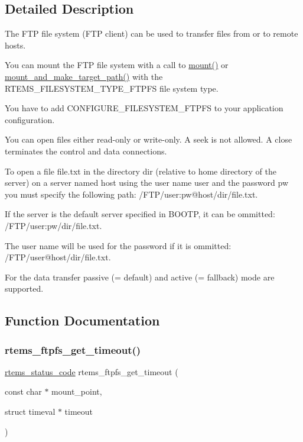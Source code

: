 \subsection{Detailed Description}
The F\+TP file system (F\+TP client) can be used to transfer files from or to remote hosts. 

You can mount the F\+TP file system with a call to \mbox{\hyperlink{group__FileSystemTypesAndMount_gaf3c1bed49bb0f3dec88d330b4f88d48b}{mount()}} or \mbox{\hyperlink{group__FileSystemTypesAndMount_ga27af6440b4ef795576c94e870c5d997f}{mount\+\_\+and\+\_\+make\+\_\+target\+\_\+path()}} with the R\+T\+E\+M\+S\+\_\+\+F\+I\+L\+E\+S\+Y\+S\+T\+E\+M\+\_\+\+T\+Y\+P\+E\+\_\+\+F\+T\+P\+FS file system type.

You have to add C\+O\+N\+F\+I\+G\+U\+R\+E\+\_\+\+F\+I\+L\+E\+S\+Y\+S\+T\+E\+M\+\_\+\+F\+T\+P\+FS to your application configuration.

You can open files either read-\/only or write-\/only. A seek is not allowed. A close terminates the control and data connections.

To open a file {\ttfamily file.\+txt} in the directory {\ttfamily dir} (relative to home directory of the server) on a server named {\ttfamily host} using the user name {\ttfamily user} and the password {\ttfamily pw} you must specify the following path\+: {\ttfamily /\+F\+T\+P/user\+:pw@host/dir/file.\+txt}.

If the server is the default server specified in B\+O\+O\+TP, it can be ommitted\+: {\ttfamily /\+F\+T\+P/user\+:pw/dir/file.\+txt}.

The user name will be used for the password if it is ommitted\+: {\ttfamily /\+F\+T\+P/user@host/dir/file.\+txt}.

For the data transfer passive (= default) and active (= fallback) mode are supported. 

\subsection{Function Documentation}
\mbox{\label{group__rtems__ftpfs_ga6dde83f58606a122aec703001c59c571}} 
\subsubsection{\texorpdfstring{rtems\_ftpfs\_get\_timeout()}{rtems\_ftpfs\_get\_timeout()}}
{\footnotesize\ttfamily \mbox{\hyperlink{group__ClassicStatus_ga545d41846817eaba6143d52ee4d9e9fe}{rtems\+\_\+status\+\_\+code}} rtems\+\_\+ftpfs\+\_\+get\+\_\+timeout (\begin{DoxyParamCaption}\item[{const char $\ast$}]{mount\+\_\+point,  }\item[{struct timeval $\ast$}]{timeout }\end{DoxyParamCaption})}



